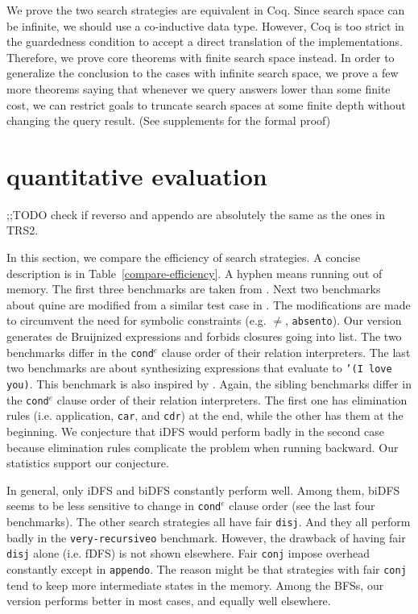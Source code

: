 \documentclass[format=acmlarge, review=true, authordraft=true]{acmart}
\newcommand{\conde}{\texttt{cond$^e$} }
\newcommand{\conj}{\texttt{conj}}
\newcommand{\disj}{\texttt{disj}}
\begin{document}
We prove the two search strategies are equivalent in Coq. Since search space 
can be infinite, we should use a co-inductive data type. However, Coq is too 
strict in the guardedness condition to accept a direct translation of the 
implementations. Therefore, we prove core theorems with finite search space 
instead. In order to generalize the conclusion to the cases with infinite 
search space, we prove a few more theorems saying that whenever we query 
answers lower than some finite cost, we can restrict goals to truncate search 
spaces at some finite depth without changing the query result. (See supplements 
for the formal proof)

\section{quantitative evaluation}

;;TODO check if reverso and appendo are absolutely the same as the ones in TRS2.

In this section, we compare the efficiency of search strategies. A concise 
description is in Table~\ref{compare-efficiency}. A hyphen means running out of 
memory. The first three benchmarks are taken from 
\citep{friedman_reasoned_2018}. Next two benchmarks about quine are modified 
from a similar test case in \citep{byrd2017unified}. The modifications are made 
to circumvent the need for symbolic constraints (e.g. $\neq$, 
\texttt{absento}). Our version generates de 
Bruijnized expressions and forbids closures going into list. The two benchmarks 
differ in the \conde clause order of their relation interpreters. The last two 
benchmarks are about synthesizing expressions that evaluate to \texttt{'(I love 
you)}. This benchmark is also inspired by \citep{byrd2017unified}. Again, the 
sibling benchmarks differ in the \conde clause order of their relation 
interpreters. The first one 
has elimination rules (i.e. application, \texttt{car}, and \texttt{cdr}) at the 
end, while the other has them at the beginning. We conjecture that iDFS would 
perform badly in the second case because elimination rules complicate the 
problem when running backward. Our statistics support our conjecture.

In general, only iDFS and biDFS constantly perform well. Among them, biDFS 
seems to be less sensitive to change in \conde clause order (see the last four 
benchmarks). The other search strategies all have fair \disj{}. And they all 
perform badly in the \texttt{very-recursiveo} benchmark. However, the drawback 
of having fair \disj{} alone (i.e. fDFS) is not shown elsewhere. Fair \conj{} 
impose overhead constantly except in \texttt{appendo}. The reason might be that 
strategies with fair \conj{} tend to keep more intermediate states in the 
memory. Among the BFSs, our version performs better in most cases, and equally 
well elsewhere. 
\end{document}
